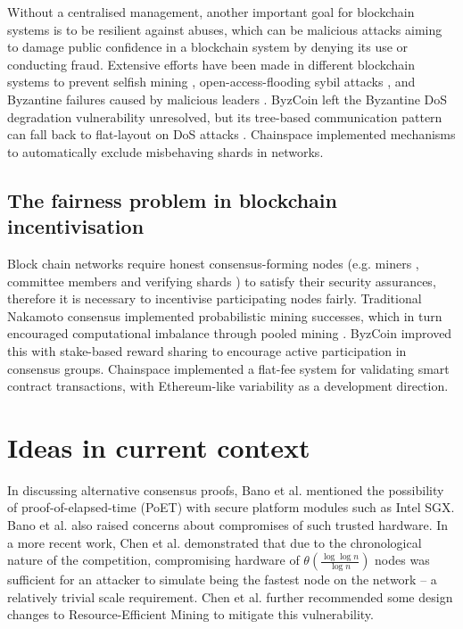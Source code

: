 \documentclass[11pt]{article}
\begin{document}
Without a centralised management, another important goal for blockchain systems is to be resilient against abuses, which can be malicious attacks aiming to damage public confidence in a blockchain system by denying its use or conducting fraud. Extensive efforts have been made in different blockchain systems to prevent selfish mining \cite[VI. E.]{bano2017consensus}, open-access-flooding sybil attacks \cite{douceur2002sybil}, and Byzantine failures caused by malicious leaders \cite[VIII. B.]{bano2017consensus}. ByzCoin \cite[Sec. 1]{kogias2016enhancing} left the Byzantine DoS degradation vulnerability unresolved, but its tree-based communication pattern can fall back to flat-layout on DoS attacks \cite[3.7.1]{kogias2016enhancing}. Chainspace \cite[VI. A.]{al2017chainspace} implemented mechanisms to automatically exclude misbehaving shards in networks.

\subsection{The fairness problem in blockchain incentivisation}

Block chain networks require honest consensus-forming nodes (e.g. miners \cite[3.6.2]{kogias2016enhancing}, committee members \cite[VII. D.]{bano2017consensus} and verifying shards \cite[IV. B.]{al2017chainspace}) to satisfy their security assurances, therefore it is necessary to incentivise participating nodes fairly. Traditional Nakamoto consensus implemented probabilistic mining successes, which in turn encouraged computational imbalance through pooled mining \cite[Sec. V]{bano2017consensus}. ByzCoin \cite[3.3]{kogias2016enhancing} improved this with stake-based reward sharing to encourage active participation in consensus groups. Chainspace \cite[Sec. VIII]{al2017chainspace} implemented a flat-fee system for validating smart contract transactions, with Ethereum-like variability as a development direction.

\section{Ideas in current context}

In discussing alternative consensus proofs, Bano et al. \cite[VI. C.]{bano2017consensus} mentioned the possibility of proof-of-elapsed-time (PoET) with secure platform modules such as Intel SGX. Bano et al. also raised concerns about compromises of such trusted hardware. In a more recent work, Chen et al. \cite{chen2017on} demonstrated that due to the chronological nature of the competition, compromising hardware of $\theta(\frac{\log\log n}{\log n})$ nodes was sufficient for an attacker to simulate being the fastest node on the network -- a relatively trivial scale requirement. Chen et al. further recommended some design changes to Resource-Efficient Mining to mitigate this vulnerability.
\end{document}
